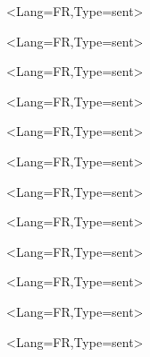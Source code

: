 \documentclass[a5paper,11pt]{article}
\begin{document}
\pagestyle{empty}

\begin{EnvtExo}%
	\ipsum<Lang=FR,Type=sent>
\end{EnvtExo}

\begin{EnvtExo}[Trait=pointilles]%
	\ipsum<Lang=FR,Type=sent>
\end{EnvtExo}

\begin{EnvtExo}[Trait=dashilles]%
	\ipsum<Lang=FR,Type=sent>
\end{EnvtExo}

\begin{EnvtExo}[Decoration=Icone/\faPython]%
	\ipsum<Lang=FR,Type=sent>
\end{EnvtExo}

\begin{EnvtExo}[Decoration=Ceinture/rouge]%
	\ipsum<Lang=FR,Type=sent>
\end{EnvtExo}

\begin{EnvtExo}[Decoration=Chrono/20]%
	\ipsum<Lang=FR,Type=sent>
\end{EnvtExo}

\begin{EnvtExo}[Etoiles=2,Decoration=Image/goku_ssj4]%
	\ipsum<Lang=FR,Type=sent>
\end{EnvtExo}

\begin{EnvtExo}[Decoration=faEtoiles/1.5§4]%
	\ipsum<Lang=FR,Type=sent>
\end{EnvtExo}

\begin{EnvtExo}[Decoration=tkzEtoiles/3.5§5]%
	\ipsum<Lang=FR,Type=sent>
\end{EnvtExo}

\begin{EnvtExo}[Decoration=Speedo/4.25§6]%
	\ipsum<Lang=FR,Type=sent>
\end{EnvtExo}

\begin{EnvtExo}[Decoration=Points/7.5]%
	\ipsum<Lang=FR,Type=sent>
\end{EnvtExo}

\begin{EnvtExo}[Type=Perso/{Titre perso },Etoiles={2.5§5}]%
	\ipsum<Lang=FR,Type=sent>
\end{EnvtExo}

\StyleEnvtExo[Couleur=red,CouleurDeco=teal,Police=\bfseries\ttfamily,EpTrait=2pt,Libelle={Exercice n°}]
\end{document}
